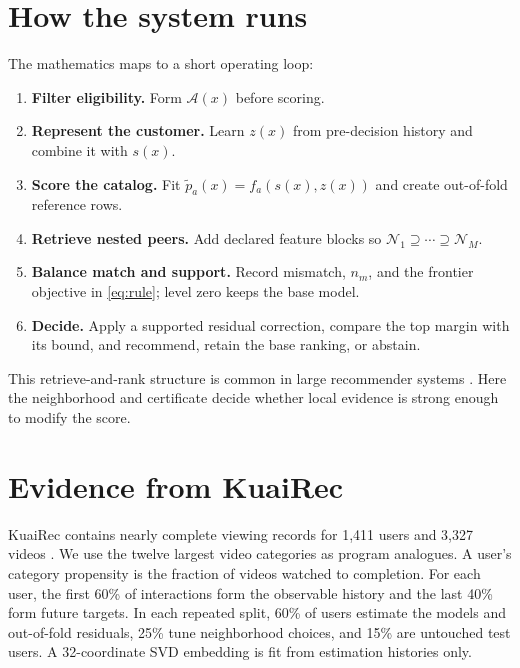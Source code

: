 \documentclass[10pt]{article}
\theoremstyle{noteplain}
\theoremstyle{definition}
\newcommand{\cA}{\mathcal A}
\newcommand{\cN}{\mathcal N}
\begin{document}
\section{How the system runs}

The mathematics maps to a short operating loop:
\begin{enumerate}[label=\textbf{\arabic*.},itemsep=.35ex]
\item \textbf{Filter eligibility.} Form $\cA(x)$ before scoring.
\item \textbf{Represent the customer.} Learn $z(x)$ from pre-decision history and combine it with $s(x)$.
\item \textbf{Score the catalog.} Fit $\widetilde p_a(x)=f_a(s(x),z(x))$ and create out-of-fold reference rows.
\item \textbf{Retrieve nested peers.} Add declared feature blocks so $\cN_1\supseteq\cdots\supseteq\cN_M$.
\item \textbf{Balance match and support.} Record mismatch, $n_m$, and the frontier objective in \eqref{eq:rule}; level zero keeps the base model.
\item \textbf{Decide.} Apply a supported residual correction, compare the top margin with its bound, and recommend, retain the base ranking, or abstain.
\end{enumerate}
This retrieve-and-rank structure is common in large recommender systems \cite{covington}. Here the neighborhood and certificate decide whether local evidence is strong enough to modify the score.

\section{Evidence from KuaiRec}

KuaiRec contains nearly complete viewing records for 1,411 users and 3,327 videos \cite{gao}. We use the twelve largest video categories as program analogues. A user's category propensity is the fraction of videos watched to completion. For each user, the first 60\% of interactions form the observable history and the last 40\% form future targets. In each repeated split, 60\% of users estimate the models and out-of-fold residuals, 25\% tune neighborhood choices, and 15\% are untouched test users. A 32-coordinate SVD embedding is fit from estimation histories only.
\end{document}
